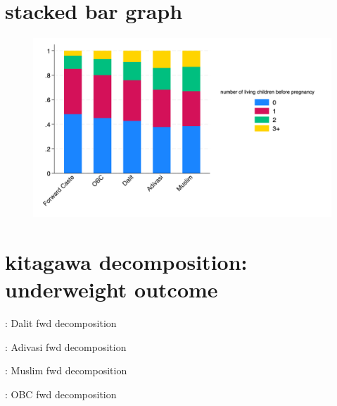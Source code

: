 \documentclass{article}
\begin{document}
\section{stacked bar graph}
\begin{figure}[H]
    \centering
    \includegraphics[width=\textwidth]{figures/stackedbar_parity_socialgroup.png}
\end{figure}


\newpage
\section{kitagawa decomposition: underweight outcome}



\begin{table}[H]
    \centering
    \footnotesize %
    \caption{: Dalit fwd decomposition}
    \label{tab:sumstat}
\end{table}

\begin{table}[H]
    \centering
    \footnotesize %
    \caption{: Adivasi fwd decomposition}
    \label{tab:sumstat}
\end{table}



\begin{table}[H]
    \centering
    \footnotesize %
    \caption{: Muslim fwd decomposition}
    \label{tab:sumstat}
\end{table}

\begin{table}[H]
    \centering
    \footnotesize %
    \caption{: OBC fwd decomposition}
    \label{tab:sumstat}
\end{table}
\end{document}
